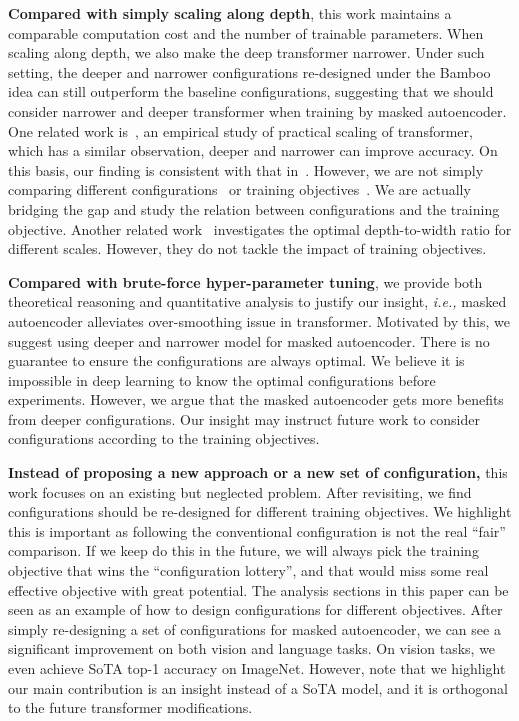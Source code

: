 \documentclass{article}
\theoremstyle{plain}
\theoremstyle{definition}
\theoremstyle{remark}
\newcommand{\ie}{\emph{i.e.,}\xspace}
\begin{document}
\textbf{Compared with simply scaling along depth}, this work maintains a comparable computation cost and the number of trainable parameters. When scaling along depth, we also make the deep transformer narrower. Under such setting, the deeper and narrower configurations re-designed under the Bamboo idea can still outperform the baseline configurations, suggesting that we should consider narrower and deeper transformer when training by masked autoencoder. One related work is~\citep{tay2021scale}, an empirical study of practical scaling of transformer, which has a similar observation, deeper and narrower can improve accuracy. 
On this basis, our finding is consistent with that in~\citep{tay2021scale}. 
However, we are not simply comparing different configurations~\citep{tay2021scale} or training objectives~\citep{voita2019bottom}. We are actually bridging the gap and study the relation between configurations and the training objective. Another related work~\citep{levine2020depth} investigates the optimal depth-to-width ratio for different scales. However, they do not tackle the impact of training objectives.

\textbf{Compared with brute-force hyper-parameter tuning}, we provide both theoretical reasoning and quantitative analysis to justify our insight, \ie masked autoencoder alleviates over-smoothing issue in transformer. Motivated by this, we suggest using deeper and narrower model for masked autoencoder. There is no guarantee to ensure the configurations are always optimal. We believe it is impossible in deep learning to know the optimal configurations before experiments. However, we argue that the masked autoencoder gets more benefits from deeper configurations. Our insight may instruct future work to consider configurations according to the training objectives.


\textbf{Instead of proposing a new approach or a new set of configuration,} this work focuses on an existing but neglected problem. After revisiting, we find configurations should be re-designed for different training objectives. We highlight this is important as following the conventional configuration is not the real ``fair'' comparison. If we keep do this in the future, we will always pick the training objective that wins the ``configuration lottery'', and that would miss some real effective objective with great potential. The analysis sections in this paper can be seen as an example of how to design configurations for different objectives. After simply re-designing a set of configurations for masked autoencoder, we can see a significant improvement on both vision and language tasks. On vision tasks, we even achieve SoTA top-1 accuracy on ImageNet. However, note that we highlight our main contribution is an insight instead of a SoTA model, and it is orthogonal to the future transformer modifications. 
\end{document}

